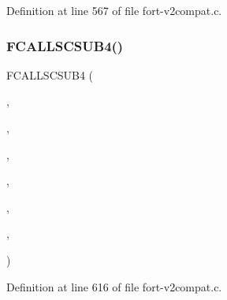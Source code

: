 Definition at line 567 of file fort-\/v2compat.\+c.

\mbox{\label{fort-v2compat_8c_ac24148f7e8193ab62ab0eb344b99c56a}} 
\subsubsection{\texorpdfstring{F\+C\+A\+L\+L\+S\+C\+S\+U\+B4()}{FCALLSCSUB4()}\hspace{0.1cm}{\footnotesize\ttfamily [1/3]}}
{\footnotesize\ttfamily F\+C\+A\+L\+L\+S\+C\+S\+U\+B4 (\begin{DoxyParamCaption}\item[{\hyperlink{nf__v2compat_8c_a8dc48f9e3a4048402e8f86f26d4fed20}{c\+\_\+ncdren}}]{,  }\item[{N\+C\+D\+R\+EN}]{,  }\item[{\hyperlink{nf__fortv2_8f90_ade22791003f60c336b970147d68ceae3}{ncdren}}]{,  }\item[{N\+C\+ID}]{,  }\item[{\hyperlink{ncfortran_8h_affac6052df8e434d04708ecc3986d215}{D\+I\+M\+ID}}]{,  }\item[{S\+T\+R\+I\+NG}]{,  }\item[{\hyperlink{fort-v2compat_8c_ae2352f39cbd25bcaf1bedbbb12db73fe}{P\+R\+C\+O\+DE}}]{ }\end{DoxyParamCaption})}



Definition at line 616 of file fort-\/v2compat.\+c.

\mbox{\label{fort-v2compat_8c_a557291686562f07d1ddc65b343dac894}} 
